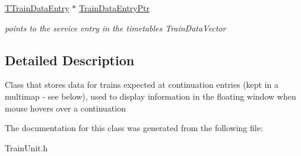 \begin{DoxyCompactItemize}
\mbox{\label{class_t_train_controller_1_1_t_continuation_train_expectation_entry_ad710cc4b0bde6c917aaba9c732773bcb}} 
\mbox{\hyperlink{class_t_train_data_entry}{T\+Train\+Data\+Entry}} $\ast$ \mbox{\hyperlink{class_t_train_controller_1_1_t_continuation_train_expectation_entry_ad710cc4b0bde6c917aaba9c732773bcb}{Train\+Data\+Entry\+Ptr}}
\begin{DoxyCompactList}\small\item\em points to the service entry in the timetable\textquotesingle{}s Train\+Data\+Vector \end{DoxyCompactList}\end{DoxyCompactItemize}


\subsection{Detailed Description}
Class that stores data for trains expected at continuation entries (kept in a multimap -\/ see below), used to display information in the floating window when mouse hovers over a continuation 

The documentation for this class was generated from the following file\+:\begin{DoxyCompactItemize}
\item 
Train\+Unit.\+h\end{DoxyCompactItemize}
